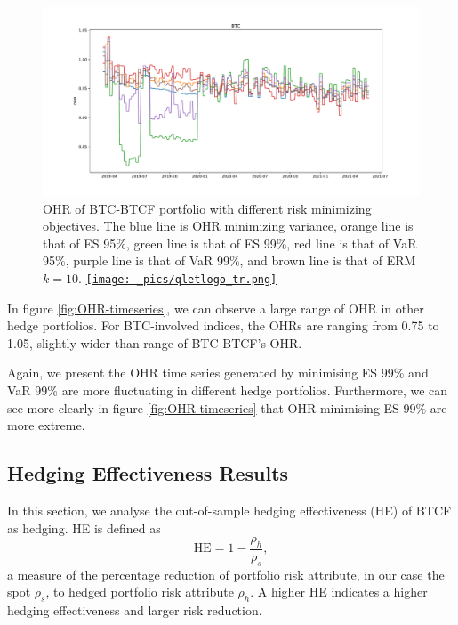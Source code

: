 \begin{figure}[t]
\includegraphics[width=\textwidth]{_pics/BTC_OHR.pdf}
  \caption{OHR of BTC-BTCF portfolio with different risk minimizing objectives. The \textcolor{plt1}{blue line} is OHR minimizing variance,
                                      \textcolor{plt2}{orange line} is that of ES 95\%,
                                      \textcolor{plt3}{green line} is that of ES 99\%,
                                      \textcolor{plt4}{red line} is that of VaR 95\%,
                                      \textcolor{plt5}{purple line} is that of VaR 99\%, and
                                      \textcolor{plt6}{brown line} is that of ERM $k=10$.
  \href{http://www.quantlet.com/}{\texttt{[image: \_pics/qletlogo\_tr.png]}} }
\label{fig:BTCOHR}
\end{figure}

In figure \ref{fig:OHR-timeseries}, we can observe a large range of OHR in other hedge portfolios.
For BTC-involved indices, the OHRs are ranging from 0.75 to 1.05, slightly wider than range of BTC-BTCF's OHR. \medskip

Again, we present the OHR time series generated by minimising ES 99\% and VaR 99\% are more fluctuating in different hedge portfolios.
Furthermore, we can see more clearly in figure \ref{fig:OHR-timeseries} that OHR minimising ES 99\% are more extreme. \medskip

\subsection{Hedging Effectiveness Results}\label {sec: HE results}
In this section, we analyse the out-of-sample hedging effectiveness (HE) of BTCF as hedging.
HE is defined as $$\text{HE} = 1-\frac{\rho_h}{\rho_s},$$
a measure of the percentage reduction of portfolio risk attribute, in our case the spot $\rho_s$,
to hedged portfolio risk attribute $\rho_h$.
A higher HE indicates a higher hedging effectiveness and larger risk reduction. \medskip

